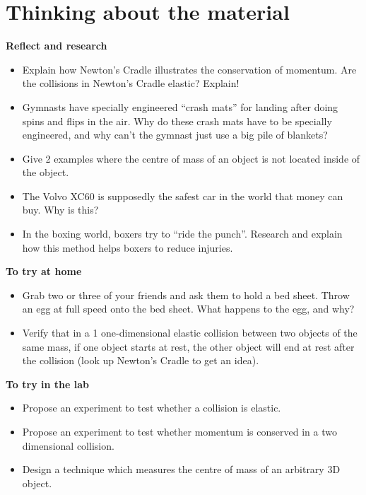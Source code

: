 \documentclass[9pt,arxiv,red]{lapreprint}
\begin{document}
\section{Thinking about the material}

\begin{framed}
\textbf{Reflect and research}\\
\begin{itemize}
\item Explain how Newton's Cradle illustrates the conservation of momentum. Are the collisions in Newton's Cradle elastic? Explain!
\item Gymnasts have specially engineered ``crash mats'' for landing after doing spins and flips in the air. Why do these crash mats have to be specially engineered, and why can't the gymnast just use a big pile of blankets?
\item Give 2 examples where the centre of mass of an object is not located inside of the object.
\item The Volvo XC60 is supposedly the safest car in the world that money can buy. Why is this?
\item In the boxing world, boxers try to ``ride the punch''. Research and explain how this method helps boxers to reduce injuries.
\end{itemize}
\end{framed}

\begin{framed}
\textbf{To try at home}\\
\begin{itemize}
\item Grab two or three of your friends and ask them to hold a bed sheet. Throw an egg at full speed onto the bed sheet. What happens to the egg, and why?
\item Verify that in a 1 one-dimensional elastic collision between two objects of the same mass, if one object starts at rest, the other object will end at rest after the collision (look up Newton's Cradle to get an idea).
\end{itemize}
\end{framed}

\begin{framed}
\textbf{To try in the lab}\\
\begin{itemize}
\item Propose an experiment to test whether a collision is elastic.
\item Propose an experiment to test whether momentum is conserved in a two dimensional collision.
\item Design a technique which measures the centre of mass of an arbitrary 3D object.
\end{itemize}
\end{framed}
\end{document}
